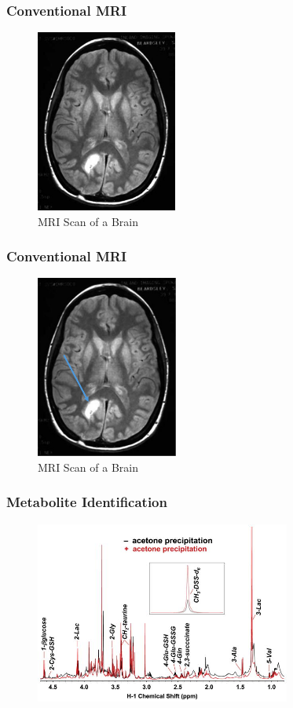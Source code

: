 \begin{frame}
  \frametitle{Conventional MRI}
  \begin{figure}[htbp!]
    \begin{center}
      \includegraphics[height=6cm]{./images/mri_tumor.png}
    \end{center}
          \caption{MRI Scan of a Brain \cite{mri_tumor}}
    \label{fig:mri_tumor}
  \end{figure}
\end{frame}

\begin{frame}
  \frametitle{Conventional MRI}
  \begin{figure}[htbp!]
    \begin{center}
      \includegraphics[height=6cm]{./images/mri_tumor_arrow.png}
    \end{center}
          \caption{MRI Scan of a Brain \cite{mri_tumor}}
    \label{fig:mri_tumor_arrow}
  \end{figure}
\end{frame}

\begin{frame}
  \frametitle{Metabolite Identification}
  \begin{figure}[htbp!]
    \begin{center}
      \includegraphics[height=6cm]{./images/chem_shift.jpg}
    \end{center}
          \caption{\cite{nmr_biochem}}
    \label{fig:chem_shift}
  \end{figure}
\end{frame}